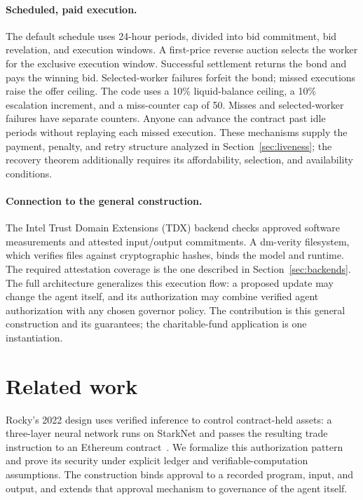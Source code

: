 \documentclass[10pt,letterpaper]{article}
\begin{document}
\paragraph{Scheduled, paid execution.}
The default schedule uses 24-hour periods, divided into bid commitment, bid revelation, and execution windows. A first-price reverse auction selects the worker for the exclusive execution window. Successful settlement returns the bond and pays the winning bid. Selected-worker failures forfeit the bond; missed executions raise the offer ceiling. The code uses a 10\% liquid-balance ceiling, a 10\% escalation increment, and a miss-counter cap of 50. Misses and selected-worker failures have separate counters. Anyone can advance the contract past idle periods without replaying each missed execution. These mechanisms supply the payment, penalty, and retry structure analyzed in Section~\ref{sec:liveness}; the recovery theorem additionally requires its affordability, selection, and availability conditions.

\paragraph{Connection to the general construction.}
The Intel Trust Domain Extensions (TDX) backend checks approved software measurements and attested input/output commitments. A dm-verity filesystem, which verifies files against cryptographic hashes, binds the model and runtime. The required attestation coverage is the one described in Section~\ref{sec:backends}. The full architecture generalizes this execution flow: a proposed update may change the agent itself, and its authorization may combine verified agent authorization with any chosen governor policy. The contribution is this general construction and its guarantees; the charitable-fund application is one instantiation.

\section{Related work}
\label{sec:related}
Rocky's 2022 design uses verified inference to control contract-held assets: a three-layer neural network runs on StarkNet and passes the resulting trade instruction to an Ethereum contract~\citep{rocky2022}. We formalize this authorization pattern and prove its security under explicit ledger and verifiable-computation assumptions. The construction binds approval to a recorded program, input, and output, and extends that approval mechanism to governance of the agent itself.
\end{document}
